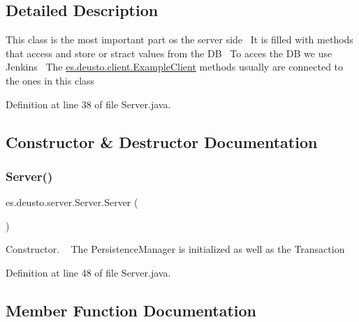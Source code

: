 \subsection{Detailed Description}
This class is the most important part os the server side~\newline
 It is filled with methods that access and store or stract values from the DB~\newline
 To acces the DB we use Jenkins~\newline
 The \hyperlink{classes_1_1deusto_1_1client_1_1_example_client}{es.\+deusto.\+client.\+Example\+Client} methods usually are connected to the ones in this class 

Definition at line 38 of file Server.\+java.



\subsection{Constructor \& Destructor Documentation}
\mbox{\label{classes_1_1deusto_1_1server_1_1_server_a84f78162a65dd737f224eb2f94c43023}} 
\subsubsection{\texorpdfstring{Server()}{Server()}}
{\footnotesize\ttfamily es.\+deusto.\+server.\+Server.\+Server (\begin{DoxyParamCaption}{ }\end{DoxyParamCaption})}

Constructor. ~\newline
The Persistence\+Manager is initialized as well as the Transaction 

Definition at line 48 of file Server.\+java.



\subsection{Member Function Documentation}
\mbox{\label{classes_1_1deusto_1_1server_1_1_server_aa9fc28b2ce1a31d8176a23768e48f173}} 
